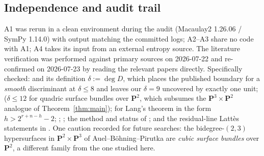 \documentclass[11pt]{amsart}
\theoremstyle{definition}
\theoremstyle{remark}
\newcommand{\PP}{\mathbf{P}}
\begin{document}
\subsection*{Independence and audit trail}
A1 was rerun in a clean environment during the audit (Macaulay2 1.26.06 /
SymPy 1.14.0) with output matching the committed logs; A2--A3 share no
code with A1; A4 takes its input from an external entropy source.  The
literature verification was performed against primary sources on
2026-07-22 and re-confirmed on 2026-07-23 by reading the relevant papers
directly.  Specifically checked: \cite[Corollary~4.9]{Massarenti} and its
definition $\delta:=\deg D$, which places the published boundary for a
\emph{smooth} discriminant at $\delta\le8$ and leaves our $\delta=9$
uncovered by exactly one unit; \cite[Corollary~4.10]{Massarenti}
($\delta\le12$ for quadric surface bundles over $\PP^2$, which subsumes the
$\PP^3\times\PP^2$ analogue of Theorem~\ref{thm:main});
\cite[Remark~2.9]{Massarenti} for Lang's theorem in the form
$h>2^{r+n-h}-2$; \cite[Theorem~1.1]{BvB}; \cite[Corollary~1.2]{Mella};
the method and status of \cite{DCV}; and the residual-line Latt\`es
statements in \cite{MMW,DabijaJonsson}.  One caution recorded for future
searches: the bidegree-$(2,3)$ hypersurfaces in $\PP^2\times\PP^3$ of
Auel--Böhning--Pirutka are \emph{cubic surface bundles} over $\PP^2$, a
different family from the one studied here.
\end{document}
